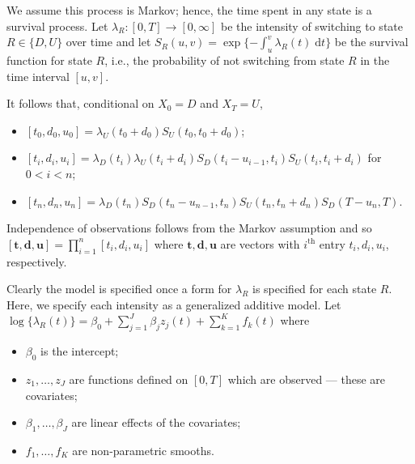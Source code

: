 \documentclass[referee]{rgclass}
\begin{document}
We assume this process is Markov; hence, the time spent in any state is a survival process. Let $\lambda_R:[0,T] \to [0,\infty]$ be the intensity of switching to state $R \in \{D, U\}$ over time and let $S_R(u, v) = \exp\{-\int_u^v \lambda_R(t)\;\mathrm{d}t\}$ be the survival function for state $R$, i.e., the probability of not switching from state $R$ in the time interval $[u, v]$.  

 It follows that, conditional on \(X_0 = D\) and \(X_T = U\),  
\begin{itemize}
\item $[t_0, d_0, u_0] = \lambda_U(t_0 + d_0)S_U(t_0, t_0 + d_0)$; 
\item $[t_i, d_i, u_i] = \lambda_D(t_i)\lambda_U(t_i + d_i)S_D(t_i - u_{i - 1}, t_i)S_U(t_i, t_i + d_i)$ for $0 < i < n$; 
\item $[t_n, d_n, u_n] = \lambda_D(t_n)S_D(t_n - u_{n - 1}, t_n)S_U(t_n, t_n + d_n)S_D(T - u_n, T)$. 
\end{itemize}  
 

Independence of observations follows from the Markov assumption and so $[\bm{t}, \bm{d}, \bm{u}] = \prod_{i = 1}^n [t_i, d_i, u_i]$ where $\bm{t}, \bm{d}, \bm{u}$ are vectors with $i^{\text{th}}$ entry $t_i, d_i, u_i$, respectively. 

Clearly the model is specified once a form for $\lambda_R$ is specified for each state $R$. Here, we specify each intensity as a generalized additive model. Let $\log\{\lambda_R(t)\}  =  \beta_0 + \sum_{j = 1}^J \beta_jz_j(t) + \sum_{k  = 1}^K f_k(t)$ where 
\begin{itemize}
\item $\beta_0$ is the intercept; 
\item $z_1, \ldots, z_J$ are functions defined on \([0,T]\) which are observed --- these are covariates; 
\item $\beta_1, \ldots, \beta_J$ are linear effects of the covariates; 
\item $f_1, \ldots, f_K$ are non-parametric smooths.  
\end{itemize}
\end{document}
